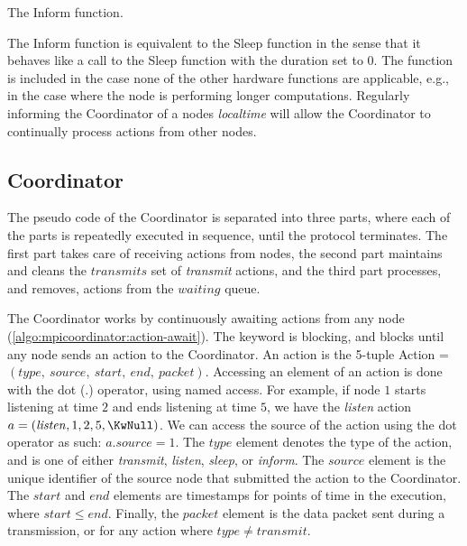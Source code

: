 \begin{algorithm}[ht]
    \DontPrintSemicolon
    
    
    \caption{The Inform function.}
    \label{algo:hwfuncsupdatelocaltime}
\end{algorithm}

The Inform function is equivalent to the Sleep function in the sense that it behaves like a call to the Sleep
function with the duration set to 0. The function is included in the case none of the other hardware
functions are applicable, e.g., in the case where the node is performing longer computations. Regularly
informing the Coordinator of a nodes \textit{localtime} will allow the Coordinator to continually process actions from
other nodes.

\subsection{Coordinator}\label{sec:coordinatorpseudo}
The pseudo code of the Coordinator is separated into three parts, where each of the parts is repeatedly
executed in sequence, until the protocol terminates. The first part takes care of receiving actions from
nodes, the second part maintains and cleans the $\mathit{transmits}$ set of \textit{transmit} actions, and the
third part processes, and removes, actions from the $\mathit{waiting}$ queue. \medbreak

The Coordinator works by continuously awaiting actions from any node
(\autoref{algo:mpicoordinator:action-await}). The \KwAwait keyword is blocking, and blocks until any node
sends an action to the Coordinator. An action is the 5-tuple Action = $(\mathit{type},\ \mathit{source},\
\mathit{start},\ \mathit{end},\ \mathit{packet})$. Accessing an element of an action is done with the dot
($.$) operator, using named access. For example, if node $1$ starts listening at time $2$ and ends listening
at time $5$, we have the \textit{listen} action $a = (\mathit{listen}, 1, 2, 5, \KwNull)$. We can access the
source of the action using the dot operator as such: $a.source = 1$. The $\mathit{type}$ element denotes the
type of the action, and is one of either \textit{transmit}, \textit{listen}, \textit{sleep}, or
\textit{inform}. The $\mathit{source}$ element is the unique identifier of the source node that submitted the
action to the Coordinator. The $\mathit{start}$ and $\mathit{end}$ elements are timestamps for points of time
in the execution, where $\mathit{start} \leq \mathit{end}$. Finally, the $\mathit{packet}$ element is the data
packet sent during a transmission, or \KwNull for any action where $\mathit{type} \neq \mathit{transmit}$.
\medbreak

